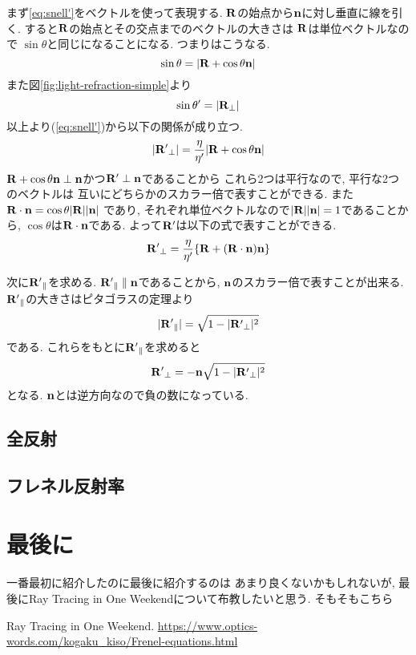 \documentclass[a4paper, xelatex, ja=standard]{bxjsarticle}
\begin{document}
まず\ref{eq:snell'}をベクトルを使って表現する.
$\vb{R}$の始点から$\vb{n}$に対し垂直に線を引く.
すると$\vb{R}$の始点とその交点までのベクトルの大きさは
$\vb{R}$は単位ベクトルなので
$\sin{\theta}$と同じになることになる.
つまりはこうなる.
\[
\sin{\theta}=|\vb{R}+\cos{\theta}\vb{n}|
\]
また図\ref{fig:light-refraction-simple}より
\[
\sin{\theta'}=|\vb{R}_\perp|
\]
以上より(\ref{eq:snell'})から以下の関係が成り立つ.
\[
|\vb{R'}_\perp|=\frac{\eta}{\eta'}|\vb{R}+\cos{\theta}\vb{n}|
\]
$\vb{R}+\cos{\theta}\vb{n}\perp\vb{n}$かつ$\vb{R'}\perp\vb{n}$であることから
これら2つは平行なので, 平行な2つのベクトルは
互いにどちらかのスカラー倍で表すことができる.
また
$\vb{R}\cdot\vb{n}=\cos{\theta}|\vb{R}||\vb{n}|$
であり,
それぞれ単位ベクトルなので$|\vb{R}||\vb{n}|=1$であることから,
$\cos{\theta}$は$\vb{R}\cdot\vb{n}$である.
よって$\vb{R'}$は以下の式で表すことができる.
\begin{equation}
\vb{R'}_\perp=\frac{\eta}{\eta'}\{\vb{R}+(\vb{R}\cdot\vb{n})\vb{n}\}
\end{equation}

次に$\vb{R'}_\parallel$を求める.
$\vb{R'}_\parallel\parallel\vb{n}$であることから,
$\vb{n}$のスカラー倍で表すことが出来る.
$\vb{R'}_\parallel$の大きさはピタゴラスの定理より
\[
|\vb{R'}_\parallel|=\sqrt{1-|\vb{R'}_\perp|^2}
\]
である.
これらをもとに$\vb{R'}_\parallel$を求めると
\begin{equation}
\vb{R'}_\perp=-\vb{n}\sqrt{1-|\vb{R'}_\perp|^2}
\end{equation}
となる.
$\vb{n}$とは逆方向なので負の数になっている.

\subsection{全反射}

\subsection{フレネル反射率}

\section{最後に}
一番最初に紹介したのに最後に紹介するのは
あまり良くないかもしれないが,
最後にRay Tracing in One Weekendについて布教したいと思う.
そもそもこちら

\begin{thebibliography}{9}
 Ray Tracing in One Weekend.
 \url{https://www.optics-words.com/kogaku_kiso/Frenel-equations.html}
\end{thebibliography}
\end{document}

